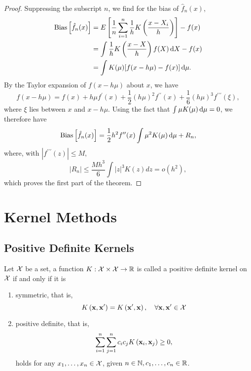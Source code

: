 \begin{proof}
	Suppressing the subscript $n$, we find for the bias of $\hat{f}_{n}(x)$,
	\begin{equation*}
		\begin{aligned}
			\mathrm{Bias}\left[\hat{f}_{n}(x)\right] & =E\left[\frac{1}{n}\sum_{i=1}^{n}\frac{1}{h}K\left(\frac{x-X_i}{h}\right)\right]-f(x) \\
			                                 & =\int\frac{1}{h}K\left(\frac{x-X}{h}\right)f(X)\mathop{}\!\mathrm{d} X-f(x)                            \\
			                                 & =\int K(\mu)[f(x-h\mu)-f(x)]\mathop{}\!\mathrm{d}\mu.
		\end{aligned}
	\end{equation*}
	By the Taylor expansion of $f(x-h\mu)$ about $x$, we have
	\begin{equation*}
		f(x-h\mu)=f(x)+h\mu f^{\prime}(x)+\frac{1}{2}(h\mu)^{2}f^{\prime\prime}(x)+\frac{1}{6}(h\mu)^{3}f^{\prime\prime\prime}(\xi),
	\end{equation*}
	where $\xi$ lies between $x$ and $x-h\mu$. Using the fact that $\int\mu K(\mu)\mathop{}\!\mathrm{d}\mu=0$, we therefore have
	\begin{equation*}
		\mathrm{Bias}\left[\hat{f}_{n}(x)\right]=\frac{1}{2}h^{2}f^{\prime\prime}(x)\int\mu^{2}K(\mu)\mathop{}\!\mathrm{d}\mu+R_{n},
	\end{equation*}
	where, with $\left|f^{\prime \prime \prime}(z)\right| \leq M$,
	\begin{equation*}
		\left|R_{n}\right| \leq \frac{M h^3}{6} \int|z|^3 K(z) d z=o\left(h^2\right),
	\end{equation*}
	which proves the first part of the theorem.
\end{proof}

\section{Kernel Methods}

\subsection{Positive Definite Kernels}

\begin{definition}
	Let ${\mathcal X}$ be a set, a function $K:{\mathcal X}\times{\mathcal X}\rightarrow{\mathbb R}$ is called a positive definite kernel on ${\mathcal X}$ if and only if it is
	\begin{enumerate}
		\item symmetric, that is,
		      \begin{equation}
			      K\left({\bf x},{\bf x}^{\prime}\right)=K\left({\bf x}^{\prime},{\bf x}\right),\quad\forall{\bf x},{\bf x}^{\prime}\in{\mathcal X}
		      \end{equation}
		\item positive definite, that is,
		      \begin{equation}
			      \sum_{i=1}^{n}\sum_{j=1}^{n}c_{i}c_{j}K\left({\bf x}_{i},{\bf x}_{j}\right)\geq 0,
		      \end{equation}
		      holds for any $x_{1},\ldots,x_{n}\in{\mathcal X}$, given $n\in\mathbb{N},c_{1},\ldots,c_{n}\in{\mathbb R}$.
	\end{enumerate}
\end{definition}


